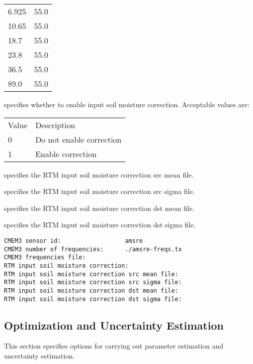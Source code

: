  \begin{tabular}{lr}
  6.925 & 55.0 \\
  10.65 & 55.0 \\
  18.7  & 55.0 \\
  23.8  & 55.0 \\
  36.5  & 55.0 \\
  89.0  & 55.0 \\
 \end{tabular}

  specifies whether to
 enable input soil moisture correction.
 Acceptable values are:

 \begin{tabular}{ll}
 Value & Description              \\
 0     & Do not enable correction \\
 1     & Enable correction        \\
 \end{tabular}

  specifies
 the RTM input soil moisture correction src mean file.

  specifies
 the RTM input soil moisture correction src sigma file.

  specifies
 the RTM input soil moisture correction dst mean file.

  specifies
 the RTM input soil moisture correction dst sigma file.
 

 \begin{Verbatim}[frame=single]
CMEM3 sensor id:                  amsre
CMEM3 number of frequencies:      ./amsre-freqs.tx
CMEM3 frequencies file:
RTM input soil moisture correction:
RTM input soil moisture correction src mean file:
RTM input soil moisture correction src sigma file:
RTM input soil moisture correction dst mean file:
RTM input soil moisture correction dst sigma file:
 \end{Verbatim}

 
 \subsection{Optimization and Uncertainty Estimation}
 \label{ssec:optimization}
 This section specifies options for carrying out parameter estimation
 and uncertainty estimation.

